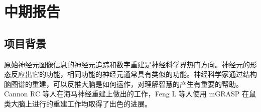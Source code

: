 \newcommand{\upcite}[1]{\textsuperscript{\textsuperscript{\cite{#1}}}}
\chapter*{\zjutitlec 中期报告}

\section{项目背景}
原始神经元图像信息的神经元追踪和数字重建是神经科学界热门方向。神经元的形态反应出它的功能，相同功能的神经元通常具有类似的功能。神经科学家通过结构脑图谱的重建，可以反推大脑是如何运作，对理解智慧的产生有重要的帮助。Cannon RC 等人在海马神经重建上做出的工作\upcite{Cannon1998An}，Feng L 等人使用 mGRASP 在鼠类大脑上进行的重建工作\upcite{Druckmann2014Structured}均取得了出色的进展。


{
\renewcommand{\chapter}[2]{\section*{#2}\addcontentsline{toc}{section}{#2}}

}